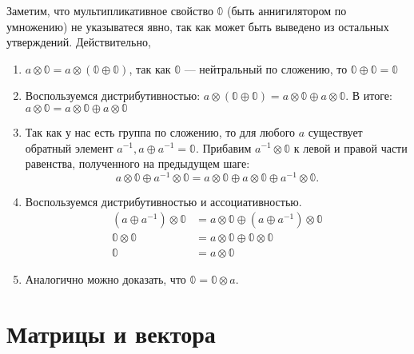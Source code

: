 \begin{definition}
	Заметим, что мультипликативное свойство $\mathbb{0}$ (быть аннигилятором по умножению) не указыватеся явно, так как может быть выведено из остальных утверждений. Действительно,
	\begin{enumerate}
		\item $a \otimes \mathbb{0} = a \otimes (\mathbb{0} \oplus \mathbb{0})$, так как $\mathbb{0}$ --- нейтральный по сложению, то $\mathbb{0} \oplus \mathbb{0} = \mathbb{0}$
		\item Воспользуемся дистрибутивностью: $a \otimes (\mathbb{0} \oplus \mathbb{0}) = a \otimes \mathbb{0} \oplus a \otimes \mathbb{0}$. В итоге: $a \otimes \mathbb{0} = a \otimes \mathbb{0} \oplus a \otimes \mathbb{0}$
		\item Так как у нас есть группа по сложению, то для любого $a$ существует обратный элемент $a^{-1}, a \oplus a^{-1} = \mathbb{0}$. Прибавим $a^{-1} \otimes \mathbb{0}$ к левой и правой части равенства, полученного на предыдущем шаге:
		      $$a \otimes \mathbb{0} \oplus a^{-1} \otimes \mathbb{0} = a \otimes \mathbb{0} \oplus a \otimes \mathbb{0} \oplus a^{-1} \otimes \mathbb{0}.$$
		\item Воспользуемся дистрибутивностью и ассоциативностью.
		      \begin{align*}
			      (a \oplus a^{-1}) \otimes \mathbb{0} & = a \otimes \mathbb{0} \oplus (a  \oplus a^{-1}) \otimes \mathbb{0} \\
			      \mathbb{0} \otimes \mathbb{0}        & = a \otimes \mathbb{0} \oplus \mathbb{0} \otimes \mathbb{0}         \\
			      \mathbb{0}                           & = a \otimes \mathbb{0}
		      \end{align*}
		\item Аналогично можно доказать, что $\mathbb{0} = \mathbb{0} \otimes a$.
	\end{enumerate}

\end{definition}



\section{Матрицы и вектора}

